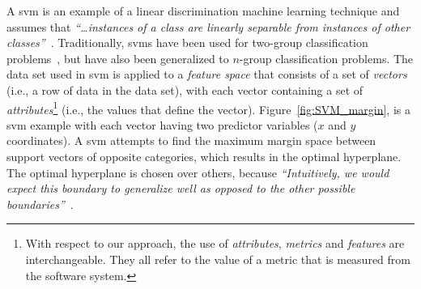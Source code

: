
A \gls{svm} is an example of a linear discrimination machine learning technique and assumes that \emph{``\ldots instances of a class are linearly separable from instances of other classes''}~\cite{ALP04}. Traditionally, \gls{svm}s have been used for two-group classification problems~\cite{CV95}, but have also been generalized to $n$-group classification problems. The data set used in \gls{svm} is applied to a \emph{feature space} that consists of a set of \emph{vectors} (i.e., a row of data in the data set), with each vector containing a set of \emph{attributes}\footnote{With respect to our approach, the use of \emph{attributes}, \emph{metrics} and \emph{features} are interchangeable. They all refer to the value of a metric that is measured from the software system.} (i.e., the values that define the vector). Figure~\ref{fig:SVM_margin}, is a \gls{svm} example with each vector having two predictor variables ($x$ and $y$ coordinates). A \gls{svm} attempts to find the maximum margin space between support vectors of opposite categories, which results in the optimal hyperplane. The optimal hyperplane is chosen over others, because \emph{``Intuitively, we would expect this boundary to generalize well as opposed to the other possible boundaries''}~\cite{Gun98}.

